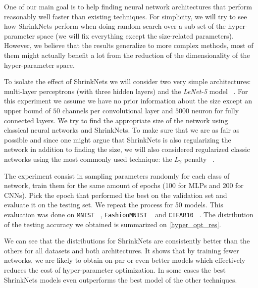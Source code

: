 \documentclass[sigconf]{acmart}
\begin{document}
One of our main goal is to help finding neural network architectures that
perform reasonably well faster than existing techniques. For simplicity, we
will try to see how ShrinkNets perform when doing random search over a sub set
of the hyper-parameter space (we will fix everything except the size-related
parameters). However, we believe that the results generalize to more complex
methods, most of them might actually benefit a lot from the reduction of the
dimensionality of the hyper-parameter space.

\par To isolate the effect of ShrinkNets we will consider two very simple
architectures: multi-layer perceptrons (with three hidden layers) and the
\textit{LeNet-5} model ~\cite{Lecun1998}. For this experiment we assume we have no prior
information about the size except an upper bound of $50$ channels per
convolutional layer and $5000$ neuron for fully connected layers.  We try to
find the appropriate size of the network using classical neural networks and
ShrinkNets. To make sure that we are as fair as possible and since one might
argue that ShrinkNets is also regularizing the network in addition to finding
the size, we will also considered regularized classic networks using the most
commonly used technique: the $L_2$ penalty ~\cite{Ng2004}.
\par The experiment consist in sampling parameters randomly for each class of
network, train them for the same amount of epochs (100 for MLPs and 200 for CNNs). Pick the epoch that performed the best on the validation set and evaluate it
on the testing set. We repeat the process for 50 models. This evaluation was done
on \texttt{MNIST} ~\cite{Lecun1998}, \texttt{FashionMNIST} ~\cite{Xiao2017} and \texttt{CIFAR10} ~\cite{Krizhevsky2009}. The distribution of the testing accuracy we obtained is summarized on \autoref{hyper_opt_res}.

We can see that the distributions for ShrinkNets are consistently better than the
others for all datasets and both architectures. It shows that by training fewer
networks, we are likely to obtain on-par or even better models which effectively
reduces the cost of hyper-parameter optimization. In some cases the best ShrinkNets
models even outperforms the best model of the other techniques.
\end{document}
